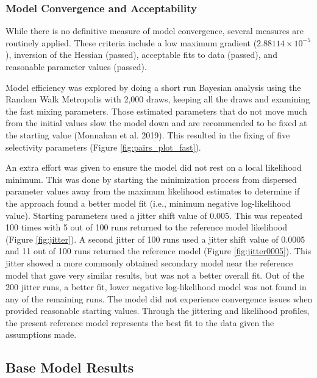 \documentclass[11pt,
  english,
  letterpaper,
]{article}
\begin{document}
\hypertarget{model-convergence}{%
\subsubsection{Model Convergence and Acceptability}\label{model-convergence}}

While there is no definitive measure of model convergence, several measures are routinely applied. These criteria include a low maximum gradient (\ensuremath{2.88114\times 10^{-5}}), inversion of the Hessian (passed), acceptable fits to data (passed), and reasonable parameter values (passed).

Model efficiency was explored by doing a short run Bayesian analysis using the Random Walk Metropolis with 2,000 draws, keeping all the draws and examining the fast mixing parameters. Those estimated parameters that do not move much from the initial values slow the model down and are recommended to be fixed at the starting value (Monnahan et al. 2019). This resulted in the fixing of five selectivity parameters (Figure \ref{fig:pairs_plot_fast}).

An extra effort was given to ensure the model did not rest on a local likelihood minimum. This was done by starting the minimization process from dispersed parameter values away from the maximum likelihood estimates to determine if the approach found a better model fit (i.e., minimum negative log-likelihood value). Starting parameters used a jitter shift value of 0.005. This was repeated 100 times with 5 out of 100 runs returned to the reference model likelihood (Figure \ref{fig:jitter}). A second jitter of 100 runs used a jitter shift value of 0.0005 and 11 out of 100 runs returned the reference model (Figure \ref{fig:jitter0005}). This jitter showed a more commonly obtained secondary model near the reference model that gave very similar results, but was not a better overall fit. Out of the 200 jitter runs, a better fit, lower negative log-likelihood model was not found in any of the remaining runs. The model did not experience convergence issues when provided reasonable starting values. Through the jittering and likelihood profiles, the present reference model represents the best fit to the data given the assumptions made.

\hypertarget{base-model-results}{%
\subsection{Base Model Results}\label{base-model-results}}
\end{document}
